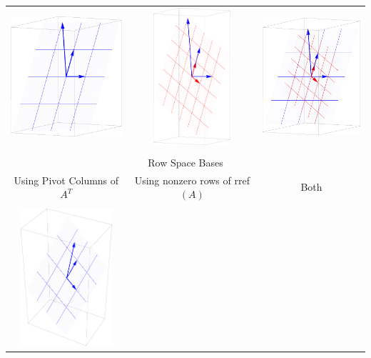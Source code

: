 \begin{table}
\begin{tabular}{ccc}
\includegraphics[height=2in]{02-Applications/support/colspace1}
&\includegraphics[height=2in]{02-Applications/support/colspace2}
&\includegraphics[height=2in]{02-Applications/support/colspace3}
\\ \\
\hline\hline \multicolumn{3}{c}{Row Space Bases}\\
\hline Using Pivot Columns of $A^T$ & Using nonzero rows of rref$(A)$ & Both\\ \\
\includegraphics[height=2in]{02-Applications/support/rowspace1}

\end{tabular}
\end{table}
